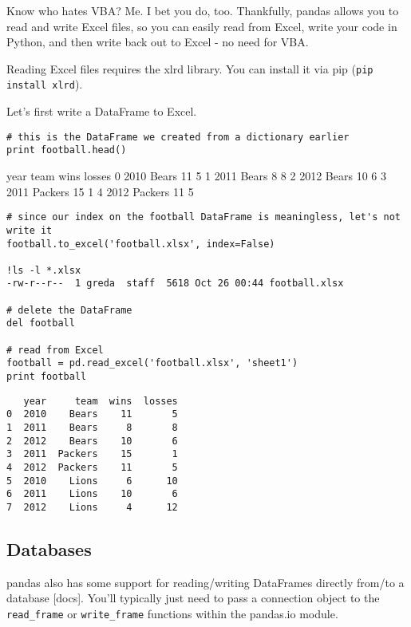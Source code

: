 \documentclass[KSmain.tex]{subfiles}
\begin{document}
Know who hates VBA? Me. I bet you do, too. Thankfully, pandas allows you to read and write Excel files, so you can easily read from Excel, write your code in Python, and then write back out to Excel - no need for VBA.

Reading Excel files requires the xlrd library. You can install it via pip (\texttt{pip install xlrd}).

Let's first write a DataFrame to Excel.

\begin{framed}
\begin{verbatim}
# this is the DataFrame we created from a dictionary earlier
print football.head()
\end{verbatim}
\end{framed}
   year     team  wins  losses
0  2010    Bears    11       5
1  2011    Bears     8       8
2  2012    Bears    10       6
3  2011  Packers    15       1
4  2012  Packers    11       5

\begin{framed}
\begin{verbatim}
# since our index on the football DataFrame is meaningless, let's not write it
football.to_excel('football.xlsx', index=False)

!ls -l *.xlsx
-rw-r--r--  1 greda  staff  5618 Oct 26 00:44 football.xlsx

# delete the DataFrame
del football

# read from Excel
football = pd.read_excel('football.xlsx', 'sheet1')
print football
\end{verbatim}
\end{framed}
\begin{verbatim}
   year     team  wins  losses
0  2010    Bears    11       5
1  2011    Bears     8       8
2  2012    Bears    10       6
3  2011  Packers    15       1
4  2012  Packers    11       5
5  2010    Lions     6      10
6  2011    Lions    10       6
7  2012    Lions     4      12
\end{verbatim}

\newpage
\subsection{Databases}

pandas also has some support for reading/writing DataFrames directly from/to a database [docs]. You'll typically just need to pass a connection object to the \texttt{read\_frame} or \texttt{write\_frame} functions within the pandas.io module.
\end{document}
